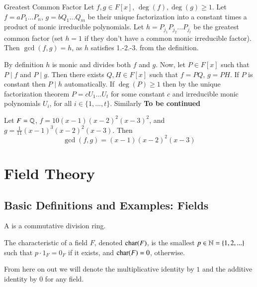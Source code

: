 \documentclass[12pt, a4paper, twoside, openright, titlepage]{book}
\begin{document}
\begin{claim}{Greatest Common Factor}{}
        Let $f,g \in F[x]$, $\deg(f),\deg(g) \geq 1$. Let $f = aP_1...P_n$, $g = bQ_1...Q_m$ be their unique factorization into a constant times a product of monic irreducible polynomials. Let $h = P_{j_1}P_{j_2}...P_{j_l}$ be the greatest common factor (set $h = 1$ if they don't have a common monic irreducible factor). Then $\gcd(f,g) = h$, as $h$ satisfies 1.-2.-3. from the definition.
\end{claim}
\begin{proof*}{}{}
        By definition $h$ is monic and divides both $f$ and $g$. Now, let $P \in F[x]$ such that $P\;\vert\;f$ and $P\;\vert\;g$. Then there exists $Q,H \in F[x]$ such that $f = PQ$, $g = PH$. If $P$ is constant then $P\;\vert\;h$ automatically. If $\deg(P) \geq 1$ then by the unique factorization theorem $P = cU_1...U_t$ for some constant $c$ and irreducible monic polynomials $U_i$, for all $i \in \{1,...,t\}$. Similarly \textbf{To be continued}
\end{proof*}

\begin{eg}{}{}
        Let $F = \mathbb Q$, $f = 10(x-1)(x-2)^2(x-3)^2$, and $g = \frac{1}{11}(x-1)^3(x-2)^2(x-3)$. Then $$\gcd(f,g) = (x-1)(x-2)^2(x-3)$$
\end{eg}




\part{Field Theory}


\chapter{\textsection\textsection Basic Definitions and Examples: Fields}



\begin{defn}{}{}
    A  is a commutative division ring.
\end{defn}


\begin{defn}{}{}
    The characteristic of a field $F$, denoted $\operatorname{char}(F)$, is the smallest $p \in \mathbb N = \{1,2,...\}$ such that $p\cdot 1_F = 0_F$ if it exists, and $\operatorname{char}(F) = 0$, otherwise.
\end{defn}

From here on out we will denote the multiplicative identity by $1$ and the additive identity by $0$ for any field.
\end{document}

